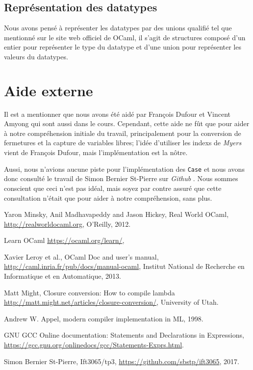 \documentclass{article}
\begin{document}
\subsection{Représentation des datatypes}
Nous avons pensé à représenter les datatypes par des unions qualifié tel que
mentionné sur le site web officiel de OCaml, il s'agit de structures composé
d'un entier pour représenter le type du datatype et d'une union pour
représenter les valeurs du datatypes.

\section{Aide externe}
Il est a mentionner que nous avons été aidé par François Dufour et Vincent
Amyong qui sont aussi dans le cours. Cependant, cette aide ne fût que pour aider
à notre compréhension initiale du travail, principalement pour la conversion de
fermetures et la capture de variables libres; l'idée d'utiliser les indexs
de \emph{Myers} vient de François Dufour, mais l'implémentation est la nôtre.

Aussi, nous n'avions aucune piste pour l'implémentation des \texttt{Case} et nous
avons donc consulté le travail de Simon Bernier St-Pierre sur \emph{Github}
\cite{sbstp}. Nous sommes conscient que ceci n'est pas idéal, mais soyez par
contre assuré que cette consultation n'était que pour aider à notre
compréhension, sans plus.
 
\begin{thebibliography}{9}

	Yaron Minsky, Anil Madhavapeddy and Jason Hickey,
	Real World OCaml,
	\url{http://realworldocaml.org},
	O'Reilly,
	2012.

	Learn OCaml
	\url{https://ocaml.org/learn/},

	Xavier Leroy et al.,
	OCaml Doc and user's manual,
	\url{http://caml.inria.fr/pub/docs/manual-ocaml},
	Institut National de Recherche en Informatique et en Automatique,
	2013.

	Matt Might,
  Closure conversion: How to compile lambda
	\url{http://matt.might.net/articles/closure-conversion/},
  University of Utah.
  
  Andrew W. Appel,
  modern compiler implementation in ML,
  1998.

  GNU GCC Online documentation: Statements and Declarations in Expressions,
	\url{https://gcc.gnu.org/onlinedocs/gcc/Statements-Exprs.html}.

  Simon Bernier St-Pierre,
  Ift3065/tp3,
	\url{https://github.com/sbstp/ift3065},
  2017.
  

\end{thebibliography}
\end{document}

